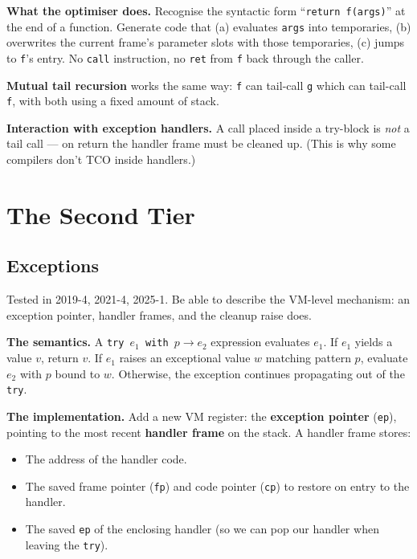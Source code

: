 \documentclass[11pt,a4paper]{article}
\begin{document}
\textbf{What the optimiser does.} Recognise the syntactic form ``\texttt{return f(args)}'' at the end of a function. Generate code that (a) evaluates \texttt{args} into temporaries, (b) overwrites the current frame's parameter slots with those temporaries, (c) jumps to \texttt{f}'s entry. No \texttt{call} instruction, no \texttt{ret} from \texttt{f} back through the caller.

\textbf{Mutual tail recursion} works the same way: \texttt{f} can tail-call \texttt{g} which can tail-call \texttt{f}, with both using a fixed amount of stack.

\textbf{Interaction with exception handlers.} A call placed inside a try-block is \emph{not} a tail call --- on return the handler frame must be cleaned up. (This is why some compilers don't TCO inside handlers.)

\hrulefill

\section{The Second Tier}

\subsection{Exceptions}

\begin{useful}
Tested in 2019-4, 2021-4, 2025-1. Be able to describe the VM-level mechanism: an exception pointer, handler frames, and the cleanup raise does.
\end{useful}

\textbf{The semantics.} A \texttt{try $e_1$ with $p \to e_2$} expression evaluates $e_1$. If $e_1$ yields a value $v$, return $v$. If $e_1$ raises an exceptional value $w$ matching pattern $p$, evaluate $e_2$ with $p$ bound to $w$. Otherwise, the exception continues propagating out of the \texttt{try}.

\textbf{The implementation.} Add a new VM register: the \textbf{exception pointer} (\texttt{ep}), pointing to the most recent \textbf{handler frame} on the stack. A handler frame stores:
\begin{itemize}[leftmargin=*,itemsep=0pt]
  \item The address of the handler code.
  \item The saved frame pointer (\texttt{fp}) and code pointer (\texttt{cp}) to restore on entry to the handler.
  \item The saved \texttt{ep} of the enclosing handler (so we can pop our handler when leaving the \texttt{try}).
\end{itemize}
\end{document}

